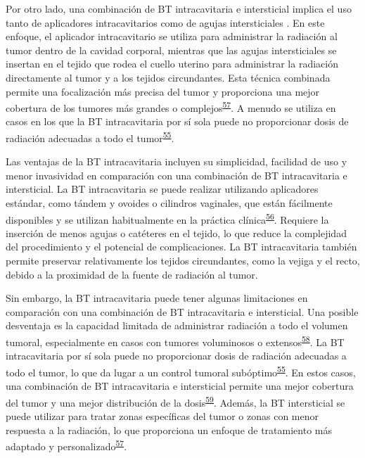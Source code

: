 \documentclass[
  a4paper,
]{scrreprt}
\begin{document}
Por otro lado, una combinación de BT intracavitaria e intersticial
implica el uso tanto de aplicadores intracavitarios como de agujas
intersticiales . En este enfoque, el aplicador intracavitario se utiliza
para administrar la radiación al tumor dentro de la cavidad corporal,
mientras que las agujas intersticiales se insertan en el tejido que
rodea el cuello uterino para administrar la radiación directamente al
tumor y a los tejidos circundantes. Esta técnica combinada permite una
focalización más precisa del tumor y proporciona una mejor cobertura de
los tumores más grandes o
complejos\textsuperscript{\protect\hyperlink{ref-fabian2019}{57}}. A
menudo se utiliza en casos en los que la BT intracavitaria por sí sola
puede no proporcionar dosis de radiación adecuadas a todo el
tumor\textsuperscript{\protect\hyperlink{ref-murofushi2020}{55}}.

Las ventajas de la BT intracavitaria incluyen su simplicidad, facilidad
de uso y menor invasividad en comparación con una combinación de BT
intracavitaria e intersticial. La BT intracavitaria se puede realizar
utilizando aplicadores estándar, como tándem y ovoides o cilindros
vaginales, que están fácilmente disponibles y se utilizan habitualmente
en la práctica
clínica\textsuperscript{\protect\hyperlink{ref-aggarwal2018}{56}}.
Requiere la inserción de menos agujas o catéteres en el tejido, lo que
reduce la complejidad del procedimiento y el potencial de
complicaciones. La BT intracavitaria también permite preservar
relativamente los tejidos circundantes, como la vejiga y el recto,
debido a la proximidad de la fuente de radiación al tumor.

Sin embargo, la BT intracavitaria puede tener algunas limitaciones en
comparación con una combinación de BT intracavitaria e intersticial. Una
posible desventaja es la capacidad limitada de administrar radiación a
todo el volumen tumoral, especialmente en casos con tumores voluminosos
o extensos\textsuperscript{\protect\hyperlink{ref-ohkubo2013}{58}}. La
BT intracavitaria por sí sola puede no proporcionar dosis de radiación
adecuadas a todo el tumor, lo que da lugar a un control tumoral
subóptimo\textsuperscript{\protect\hyperlink{ref-murofushi2020}{55}}. En
estos casos, una combinación de BT intracavitaria e intersticial permite
una mejor cobertura del tumor y una mejor distribución de la
dosis\textsuperscript{\protect\hyperlink{ref-tan2015}{59}}. Además, la
BT intersticial se puede utilizar para tratar zonas específicas del
tumor o zonas con menor respuesta a la radiación, lo que proporciona un
enfoque de tratamiento más adaptado y
personalizado\textsuperscript{\protect\hyperlink{ref-fabian2019}{57}}.
\end{document}

